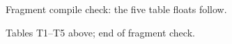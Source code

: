\documentclass{FrontiersinHarvard}
\begin{document}
Fragment compile check: the five table floats follow.

Tables T1--T5 above; end of fragment check.
\clearpage
\end{document}
